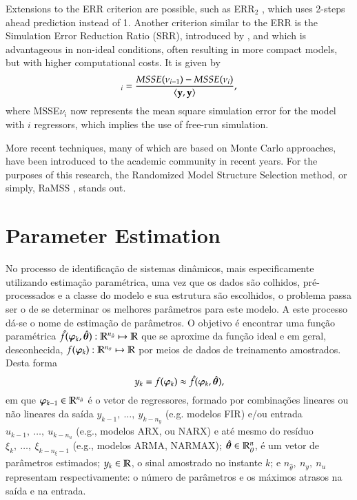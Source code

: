 Extensions to the ERR criterion are possible, such as ERR$_2$ \citep{alves2012}, which uses 2-steps ahead prediction instead of 1.
Another criterion similar to the ERR is the Simulation Error Reduction Ratio (SRR), introduced by \citep{piroddi2003}, and which is advantageous in non-ideal conditions, often resulting in more compact models, but with higher computational costs. It is given by
\begin{equation}
   [\text{SRR}]_i  = \frac{MSSE(\nu_{i-1})-MSSE(\nu_i)}{\langle\vy,\vy\rangle}
   \label{eq:SRR},
\end{equation}
where MSSE$\nu_i$ now represents the mean square simulation error for the model with $i$ regressors, which implies the use of free-run simulation.

More recent techniques, many of which are based on Monte Carlo approaches, have been introduced to the academic community in recent years. For the purposes of this research, the Randomized Model Structure Selection method, or simply, RaMSS \citep{falsone2014,falsone2015}, stands out.




\section{Parameter Estimation}%
\label{sec:parest}

No processo de identificação de sistemas dinâmicos, mais especificamente utilizando estimação paramétrica, uma vez que os dados são colhidos, pré-processados e a classe do modelo e sua estrutura são escolhidos, o problema passa ser o de se determinar os melhores parâmetros para este modelo. A este processo dá-se o nome de estimação de parâmetros. O objetivo é encontrar uma função paramétrica $\hat{f}(\bm{\varphi}_{k},\hat{\bm{\theta}}) :  \mathbb{R}^{n_{\hat{\theta}}} \mapsto \mathbb{R}$ que se aproxime da função ideal e em geral, desconhecida, $f(\bm{\varphi}_{k}) : \mathbb{R}^{n_\theta} \mapsto \mathbb{R}$ por meios de dados de treinamento amostrados. Desta forma
\begin{equation}
   y_k = f(\bm{\varphi}_{k}) \approx \hat{f}(\bm{\varphi}_{k},\hat{\bm{\theta}}),
\end{equation}
em que $\bm{\varphi}_{k-1} \in \mathbb{R}^{n_{\hat{\theta}}}$ é o vetor de regressores, formado por combinações lineares ou não lineares da saída $y_{k-1},\  \dots ,\ y_{k-n_y}$ (e.g. modelos FIR) e/ou entrada $u_{k-1},\  \dots ,\ u_{k-n_u}$ (e.g., modelos ARX, ou NARX) e até mesmo do resíduo $\xi_{k},\  \dots ,\ \xi_{k-n_\xi-1}$ (e.g., modelos ARMA, NARMAX); $\hat{\bm{\theta}} \in \mathbb{R}^n_\theta$, é um vetor de parâmetros estimados; $y_k \in \mathbb{R}$, o sinal amostrado no instante $k$; e $n_{\hat{\theta}},\ n_y,\ n_u$  representam respectivamente: o número de parâmetros e os máximos atrasos na saída e na entrada. 

